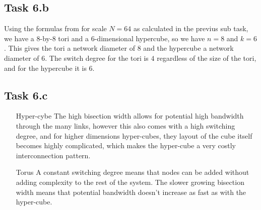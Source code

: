 \subsection{Task 6.b}


Using the formulas from \cite[slide 38]{l7Interconnect} for scale $N=64$ as
calculated in the previus sub task, we have a $8$-by-$8$ tori and a
$6$-dimensional hypercube, so we have $n=8$ and $k=6$. This gives the tori a
network diameter of $8$ and the hypercube a network diameter of $6$. The switch
degree for the tori is $4$ regardless of the size of the tori, and for the
hypercube it is $6$.

\subsection{Task 6.c}
\begin{itemize}
    \item[Hyper-cybe] The high bisection width allows for potential high
    bandwidth through the many links, however this also comes with a high
    switching degree, and for higher dimensions hyper-cubes, they layout of the
    cube itself becomes highly complicated, which makes the hyper-cube a very
    costly interconnection pattern.

    \item[Torus] A constant switching degree means that nodes can be added
    without adding complexity to the rest of the system. The slower growing
    bisection width means that potential bandwidth doesn't increase as fast as
    with the hyper-cube.
\end{itemize}
